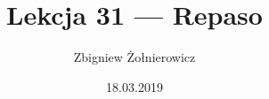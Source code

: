 \documentclass[a4paper]{article}
\begin{document}
    \title{Lekcja 31 --- Repaso}
    \author{Zbigniew Żołnierowicz}
    \date{18.03.2019}
    \maketitle
\end{document}

